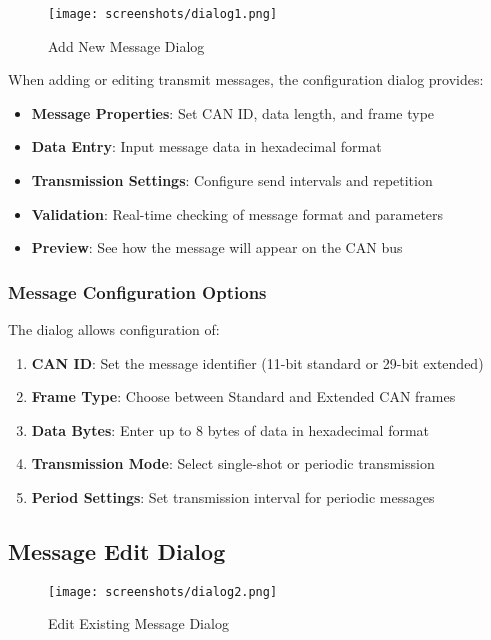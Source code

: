\documentclass[11pt,a4paper]{article}
\begin{document}
\begin{figure}[H]
    \centering
    \texttt{[image: screenshots/dialog1.png]}
    \caption{Add New Message Dialog}
    \label{fig:dialog1}
\end{figure}

When adding or editing transmit messages, the configuration dialog provides:

\begin{itemize}
    \item \textbf{Message Properties}: Set CAN ID, data length, and frame type
    \item \textbf{Data Entry}: Input message data in hexadecimal format
    \item \textbf{Transmission Settings}: Configure send intervals and repetition
    \item \textbf{Validation}: Real-time checking of message format and parameters
    \item \textbf{Preview}: See how the message will appear on the CAN bus
\end{itemize}

\subsubsection{Message Configuration Options}

The dialog allows configuration of:

\begin{enumerate}
    \item \textbf{CAN ID}: Set the message identifier (11-bit standard or 29-bit extended)
    \item \textbf{Frame Type}: Choose between Standard and Extended CAN frames
    \item \textbf{Data Bytes}: Enter up to 8 bytes of data in hexadecimal format
    \item \textbf{Transmission Mode}: Select single-shot or periodic transmission
    \item \textbf{Period Settings}: Set transmission interval for periodic messages
\end{enumerate}

\subsection{Message Edit Dialog}

\begin{figure}[H]
    \centering
    \texttt{[image: screenshots/dialog2.png]}
    \caption{Edit Existing Message Dialog}
    \label{fig:dialog2}
\end{figure}
\end{document}
